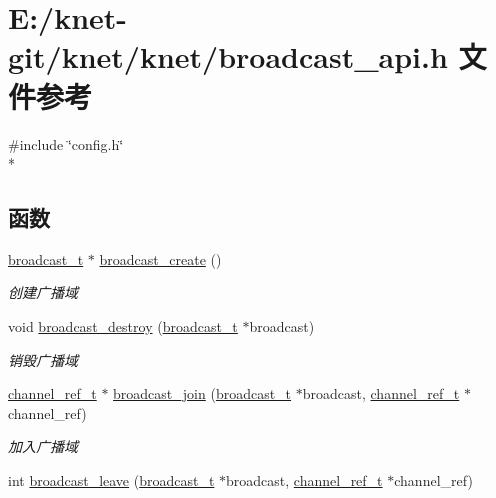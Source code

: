 \hypertarget{a00036}{}\section{E\+:/knet-\/git/knet/knet/broadcast\+\_\+api.h 文件参考}
\label{a00036}
{\ttfamily \#include \char`\"{}config.\+h\char`\"{}}\\*
\subsection*{函数}
\begin{DoxyCompactItemize}
\item 
\hyperlink{a00044_ac970c5deaf6417a866aabed01cd57b1b_ac970c5deaf6417a866aabed01cd57b1b}{broadcast\+\_\+t} $\ast$ \hyperlink{a00083_gaa3b09fb6ff3281cb10736c0aabac18fc_gaa3b09fb6ff3281cb10736c0aabac18fc}{broadcast\+\_\+create} ()
\begin{DoxyCompactList}\small\item\em 创建广播域 \end{DoxyCompactList}\item 
void \hyperlink{a00083_gaa28451fa4656633ded0c7b966ff159c3_gaa28451fa4656633ded0c7b966ff159c3}{broadcast\+\_\+destroy} (\hyperlink{a00044_ac970c5deaf6417a866aabed01cd57b1b_ac970c5deaf6417a866aabed01cd57b1b}{broadcast\+\_\+t} $\ast$broadcast)
\begin{DoxyCompactList}\small\item\em 销毁广播域 \end{DoxyCompactList}\item 
\hyperlink{a00044_a151271c9d188ef28d4d24bb81dcc1263_a151271c9d188ef28d4d24bb81dcc1263}{channel\+\_\+ref\+\_\+t} $\ast$ \hyperlink{a00083_ga1c736809a1d0e4b7c77b617ac8ce590d_ga1c736809a1d0e4b7c77b617ac8ce590d}{broadcast\+\_\+join} (\hyperlink{a00044_ac970c5deaf6417a866aabed01cd57b1b_ac970c5deaf6417a866aabed01cd57b1b}{broadcast\+\_\+t} $\ast$broadcast, \hyperlink{a00044_a151271c9d188ef28d4d24bb81dcc1263_a151271c9d188ef28d4d24bb81dcc1263}{channel\+\_\+ref\+\_\+t} $\ast$channel\+\_\+ref)
\begin{DoxyCompactList}\small\item\em 加入广播域 \end{DoxyCompactList}\item 
int \hyperlink{a00083_gad846ced37d33b750f61a88565eaed9a4_gad846ced37d33b750f61a88565eaed9a4}{broadcast\+\_\+leave} (\hyperlink{a00044_ac970c5deaf6417a866aabed01cd57b1b_ac970c5deaf6417a866aabed01cd57b1b}{broadcast\+\_\+t} $\ast$broadcast, \hyperlink{a00044_a151271c9d188ef28d4d24bb81dcc1263_a151271c9d188ef28d4d24bb81dcc1263}{channel\+\_\+ref\+\_\+t} $\ast$channel\+\_\+ref)

\end{DoxyCompactItemize}
